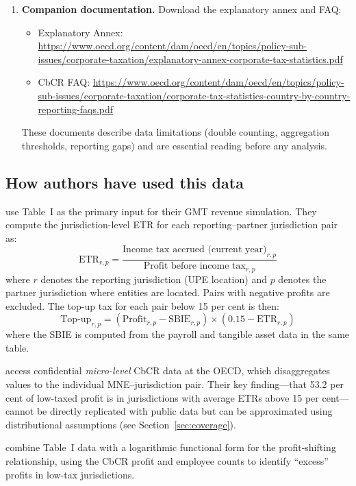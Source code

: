 \documentclass[12pt,a4paper]{article}
\begin{document}
\begin{enumerate}
\item \textbf{Companion documentation.} Download the explanatory annex and FAQ:
\begin{itemize}
    \item Explanatory Annex: \url{https://www.oecd.org/content/dam/oecd/en/topics/policy-sub-issues/corporate-taxation/explanatory-annex-corporate-tax-statistics.pdf}
    \item CbCR FAQ: \url{https://www.oecd.org/content/dam/oecd/en/topics/policy-sub-issues/corporate-taxation/corporate-tax-statistics-country-by-country-reporting-faqs.pdf}
\end{itemize}
These documents describe data limitations (double counting, aggregation thresholds, reporting gaps) and are essential reading before any analysis.
\end{enumerate}

\subsection{How authors have used this data}

\textcite{barake2022} use Table~I as the primary input for their GMT revenue simulation.
They compute the jurisdiction-level ETR for each reporting--partner jurisdiction pair as:
\[
\text{ETR}_{r,p} = \frac{\text{Income tax accrued (current year)}_{r,p}}{\text{Profit before income tax}_{r,p}}
\]
where $r$ denotes the reporting jurisdiction (UPE location) and $p$ denotes the partner jurisdiction where entities are located.
Pairs with negative profits are excluded.
The top-up tax for each pair below 15 per cent is then:
\[
\text{Top-up}_{r,p} = (\text{Profit}_{r,p} - \text{SBIE}_{r,p}) \times (0.15 - \text{ETR}_{r,p})
\]
where the SBIE is computed from the payroll and tangible asset data in the same table.

\textcite{hugger2025} access confidential \emph{micro-level} CbCR data at the OECD, which disaggregates values to the individual MNE--jurisdiction pair.
Their key finding---that 53.2 per cent of low-taxed profit is in jurisdictions with average ETRs above 15 per cent---cannot be directly replicated with public data but can be approximated using distributional assumptions (see Section~\ref{sec:coverage}).

\textcite{garcia2024} combine Table~I data with a logarithmic functional form for the profit-shifting relationship, using the CbCR profit and employee counts to identify ``excess'' profits in low-tax jurisdictions.
\end{document}
